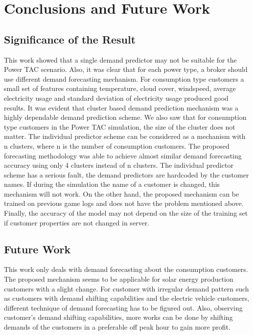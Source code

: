 
\chapter{Conclusions and Future Work}

\section{Significance of the Result}
This work showed that a single demand predictor may not be suitable for the Power TAC scenario. Also, it was clear that for each power type, a broker should use different demand forecasting mechanism. For consumption type customers a small set of features containing temperature, cloud cover, windspeed, average electricity usage and standard deviation of electricity usage produced good results. It was evident that cluster based demand prediction mechanism was a highly dependable demand prediction scheme. We also saw that for consumption type customers in the Power TAC simulation, the size of the cluster does not matter. The individual predictor scheme can be considered as a mechanism with n clusters, where n is the number of consumption customers. The proposed forecasting methodology was able to achieve almost similar demand forecasting accuracy using only 4 clusters instead of n clusters. The individual predictor scheme has a serious fault, the demand predictors are hardcoded by the customer names. If during the simulation the name of a customer is changed, this mechanism will not work. On the other hand, the proposed mechanism can be trained on previous game logs and does not have the problem mentioned above. Finally, the accuracy of the model may not depend on the size of the training set if customer properties are not changed in server.

\section{Future Work}

This work only deals with demand forecasting about the consumption customers. The proposed mechanism seems to be applicable for solar energy production customers with a slight change. For customer with irregular demand pattern such as customers with demand shifting capabilities and the electric vehicle customers, different technique of demand forecasting has to be figured out. Also, observing customer's demand shifting capabilities, more works can be done by shifting demands of the customers in a preferable off peak hour to gain more profit.
